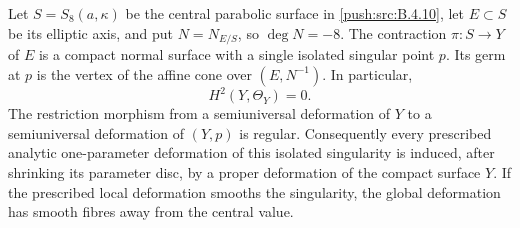 \begin{proposition}\hypertarget{tag-030F}{}\label{push:src:B.4.11}

Let $S=S_8(a,\kappa)$ be the central parabolic surface in \ref{push:src:B.4.10},
let $E\subset S$ be its elliptic axis, and put
$N=N_{E/S}$, so $\deg N=-8$.
The contraction $\pi:S\to Y$ of $E$ is a compact normal surface
with a single isolated singular point $p$.
Its germ at $p$ is the vertex of the affine cone over
$(E,N^{-1})$.  In particular,
\[
 H^2(Y,\Theta_Y)=0.
\]
The restriction morphism from a semiuniversal deformation of $Y$
to a semiuniversal deformation of $(Y,p)$ is regular.
Consequently every prescribed analytic one-parameter deformation
of this isolated singularity is induced, after shrinking its
parameter disc, by a proper deformation of the compact surface $Y$.
If the prescribed local deformation smooths the singularity, the
global deformation has smooth fibres away from the central value.
\end{proposition}



